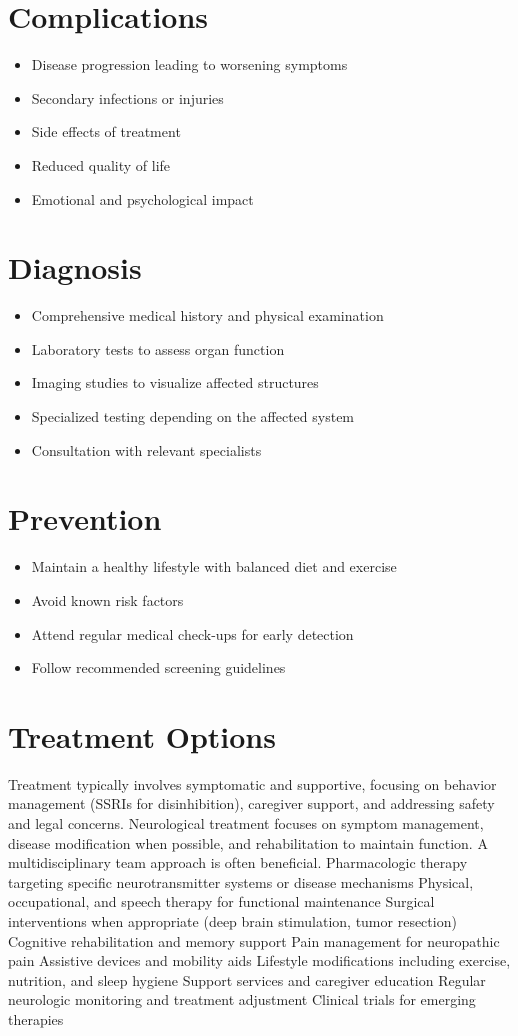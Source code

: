 \section{Complications}
\begin{itemize}[noitemsep]
  \item Disease progression leading to worsening symptoms
  \item Secondary infections or injuries
  \item Side effects of treatment
  \item Reduced quality of life
  \item Emotional and psychological impact
\end{itemize}
\section{Diagnosis}
\begin{itemize}[noitemsep]
  \item Comprehensive medical history and physical examination
  \item Laboratory tests to assess organ function
  \item Imaging studies to visualize affected structures
  \item Specialized testing depending on the affected system
  \item Consultation with relevant specialists
\end{itemize}
\section{Prevention}
\begin{itemize}[noitemsep]
  \item Maintain a healthy lifestyle with balanced diet and exercise
  \item Avoid known risk factors
  \item Attend regular medical check-ups for early detection
  \item Follow recommended screening guidelines
\end{itemize}
\section{Treatment Options}
Treatment typically involves symptomatic and supportive, focusing on behavior management (SSRIs for disinhibition), caregiver support, and addressing safety and legal concerns. Neurological treatment focuses on symptom management, disease modification when possible, and rehabilitation to maintain function. A multidisciplinary team approach is often beneficial. Pharmacologic therapy targeting specific neurotransmitter systems or disease mechanisms Physical, occupational, and speech therapy for functional maintenance Surgical interventions when appropriate (deep brain stimulation, tumor resection) Cognitive rehabilitation and memory support Pain management for neuropathic pain Assistive devices and mobility aids Lifestyle modifications including exercise, nutrition, and sleep hygiene Support services and caregiver education Regular neurologic monitoring and treatment adjustment Clinical trials for emerging therapies

